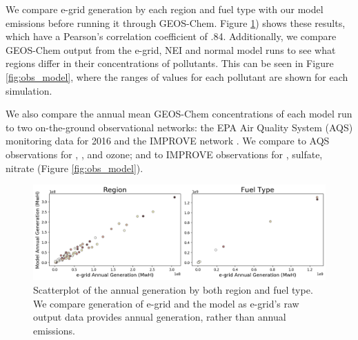 \documentclass[12]{article}
\begin{document}
We compare e-grid generation by each region and fuel type with our model emissions before running it through GEOS-Chem. 
Figure \ref{fig:emissions_region}) shows these results, which have a Pearson's correlation coefficient of .84. Additionally, we compare GEOS-Chem output from the e-grid, NEI and normal model runs to see what regions differ in their concentrations of pollutants. This can be seen in Figure \ref{fig:obs_model}, where the ranges of values for each pollutant are shown for each simulation.

We also compare the annual mean GEOS-Chem concentrations of each model run to two on-the-ground observational networks: the EPA Air Quality System (AQS) monitoring data for 2016 \citep{us_epa_daily_2016} and the IMPROVE network \citep{malm_spatial_1994}. We compare to AQS observations for , ,  and ozone; and to IMPROVE observations for , sulfate, nitrate (Figure \ref{fig:obs_model}).


\begin{figure}
    \centering
    \includegraphics[scale=0.3]{ego_nonuclear_project/Figures/egrid_model.png}
    \caption{Scatterplot of the annual generation by both region and fuel type. We compare generation of e-grid and the model as e-grid's raw output data provides annual generation, rather than annual emissions.} 
    \label{fig:emissions_region}
\end{figure}
\end{document}
